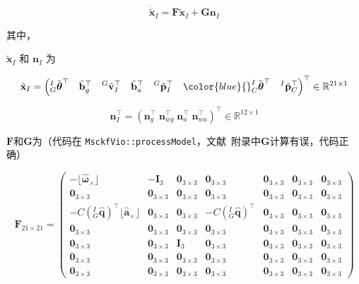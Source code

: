 \documentclass[12pt,a4paper]{article}
\begin{document}
\begin{equation}
\dot{\tilde{\mathbf{x}}}_I = 
\mathbf{F} \tilde{\mathbf{x}}_I + 
\mathbf{G} \mathbf{n}_I
\end{equation}

其中，

$\tilde{\mathbf{x}}_{I}$ 和 $\mathbf{n}_I$ 为

$$
\tilde{\mathbf{x}}_{I} = 
\left(
{}^I_G \tilde{\boldsymbol{\theta}}^\top \quad 
\tilde{\mathbf{b}}_g^\top \quad 
{}^G\tilde{\mathbf{v}}^\top_I \quad 
\tilde{\mathbf{b}}_a^\top \quad
{}^G\tilde{\mathbf{p}}^\top_I \quad
{\color{blue}
{}^I_C \tilde{\boldsymbol{\theta}}^\top \quad
{}^I\tilde{\mathbf{p}}^\top_C}
\right)^\top 
\in \mathbb{R}^{21 \times 1}
$$

$$
\mathbf{n}_I^\top = 
\left(
\mathbf{n}_g^\top \; \mathbf{n}_{wg}^\top \; \mathbf{n}_a^\top \; \mathbf{n}_{wa}^\top
\right)^\top
\in \mathbb{R}^{12 \times 1}
$$

$\mathbf{F}$和$\mathbf{G}$为（代码在 \verb|MsckfVio::processModel|，文献~\citep{sun2018robust}附录中$\mathbf{G}$计算有误，代码正确）

\begin{equation*}
\mathbf{F}_{21 \times 21} = 
\begin{pmatrix}
-\lfloor\hat{\boldsymbol{\omega}}{}_{\times}\rfloor & -\mathbf{I}_3 & 
\mathbf{0}_{3\times 3} & \mathbf{0}_{3\times 3} & \mathbf{0}_{3\times 3} & \mathbf{0}_{3\times 3} & \mathbf{0}_{3\times 3} \\
\mathbf{0}_{3\times 3} & \mathbf{0}_{3\times 3} & \mathbf{0}_{3\times 3} & 
\mathbf{0}_{3\times 3} & \mathbf{0}_{3\times 3} & \mathbf{0}_{3\times 3} & \mathbf{0}_{3\times 3} \\
-C\left({}^I_G\hat{\mathbf{q}}\right)^\top\lfloor\hat{\mathbf{a}}{}_{\times}\rfloor & 
\mathbf{0}_{3\times 3} & \mathbf{0}_{3\times 3} & 
-C\left({}^I_G\hat{\mathbf{q}}\right)^\top & \mathbf{0}_{3\times 3} & \mathbf{0}_{3\times 3} & \mathbf{0}_{3\times 3} \\
\mathbf{0}_{3\times 3} & \mathbf{0}_{3\times 3} & \mathbf{0}_{3\times 3} & 
\mathbf{0}_{3\times 3} & \mathbf{0}_{3\times 3} & \mathbf{0}_{3\times 3} & \mathbf{0}_{3\times 3} \\
\mathbf{0}_{3\times 3} & \mathbf{0}_{3\times 3} & \mathbf{I}_3 & 
\mathbf{0}_{3\times 3} & \mathbf{0}_{3\times 3} & \mathbf{0}_{3\times 3} & \mathbf{0}_{3\times 3} \\
\mathbf{0}_{3\times 3} & \mathbf{0}_{3\times 3} & \mathbf{0}_{3\times 3} & 
\mathbf{0}_{3\times 3} & \mathbf{0}_{3\times 3} & \mathbf{0}_{3\times 3} & \mathbf{0}_{3\times 3} \\
\mathbf{0}_{3\times 3} & \mathbf{0}_{3\times 3} & \mathbf{0}_{3\times 3} & 
\mathbf{0}_{3\times 3} & \mathbf{0}_{3\times 3} & \mathbf{0}_{3\times 3} & \mathbf{0}_{3\times 3}
\end{pmatrix}
\end{equation*}
\end{document}
